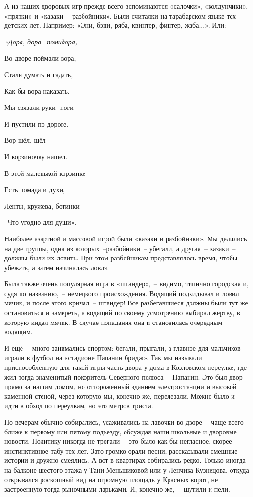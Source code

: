 А из наших дворовых игр прежде всего вспоминаются «салочки», «колдунчики», «прятки» и «казаки~-- разбойники». Были считалки на тарабарском языке тех детских лет. Например: «Эни, бэни, ряба, квинтер, финтер, жаба...». Или:

\indent

{\itshape
«Дора, дора --помидора,

 Во дворе поймали вора,
 
  Стали думать и гадать,
  
Как бы вора наказать.

Мы связали руки -ноги
 
И пустили по дороге. 

Вор шёл, шёл 

И корзиночку нашел. 

В этой маленькой корзинке 

Есть помада и духи, 

Ленты, кружева, ботинки
 
--Что угодно для души».

}

\indent

Наиболее азартной и массовой игрой были «казаки и разбойники». Мы делились на две группы, одна из которых~--разбойники~-- убегали, а другая~-- казаки~-- должны были их ловить. При этом разбойникам представлялось время, чтобы убежать, а затем начиналась ловля.

Была также очень популярная игра в «штандер»,~-- видимо, типично городская и, судя по названию,~-- немецкого происхождения. Водящий подкидывал и ловил мячик, и после этого кричал~-- штандер! Все разбегавшиеся должны были тут же остановиться и замереть, а водящий по своему усмотрению выбирал жертву, в которую кидал мячик. В случае попадания она и становилась очередным водящим.

И ещё~-- много занимались спортом: бегали, прыгали, а главное для мальчиков~-- играли в футбол на «стадионе Папанин бридж». Так мы называли приспособленную для такой игры часть двора у дома в Козловском переулке, где жил тогда знаменитый покоритель Северного полюса~-- Папанин. Это был двор прямо за нашим домом, но отгороженный зданием электростанции и высокой каменной стеной, через которую мы, конечно же, перелезали. Можно было и идти в обход по переулкам, но это метров триста.

По вечерам обычно собирались, усаживались на лавочки во дворе~-- чаще всего ближе к первому или пятому подъезду, обсуждая наши школьные и дворовые новости. Политику никогда не трогали~-- это было как бы негласное, скорее инстинктивное табу тех лет. Зато громко орали песни, рассказывали смешные истории и дружно смеялись. А вот в квартирах собирались редко. Только иногда на балконе шестого этажа у Тани Меньшиковой или у Ленчика Кузнецова, откуда открывался роскошный вид на огромную площадь у Красных ворот, не застроенную тогда рыночными ларьками. И, конечно же,~-- шутили и пели.

